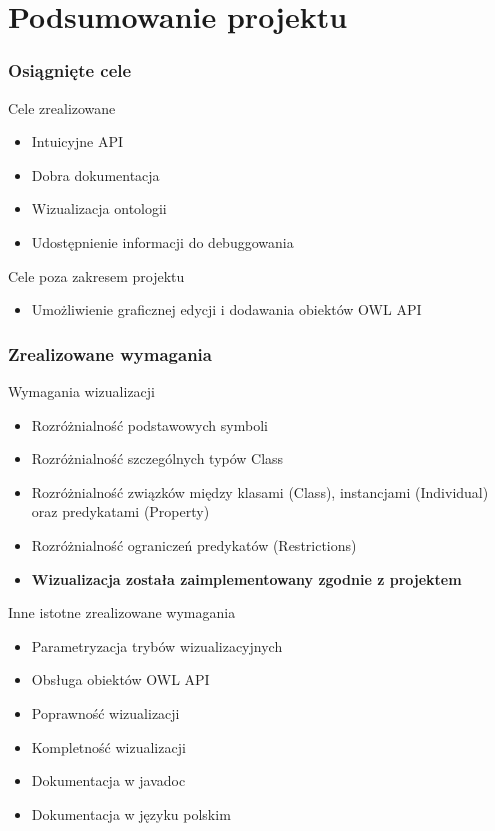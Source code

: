 \documentclass[xcolor=dvipsnames,9pt]{beamer}
\begin{document}
\section{Podsumowanie projektu}

\begin{frame}
	\frametitle{Osiągnięte cele}

\begin{block}{Cele zrealizowane}
		\begin{itemize}
			\item Intuicyjne API
			  \item Dobra dokumentacja
			\item Wizualizacja ontologii 
			\item Udostępnienie informacji do debuggowania 
	\end{itemize}
	\end{block}




	\begin{block}{Cele poza zakresem projektu}
		\begin{itemize}
			\item Umożliwienie graficznej edycji i dodawania obiektów OWL API
	\end{itemize}
	\end{block}


\end{frame}


\begin{frame}
	\frametitle{Zrealizowane wymagania}
	

	\begin{block}{Wymagania wizualizacji}
	\begin{itemize}
			
			\item Rozróżnialność podstawowych symboli
			\item Rozróżnialność szczególnych typów Class
			\item Rozróżnialność związków między klasami (Class), instancjami (Individual) oraz predykatami (Property)
			\item Rozróżnialność ograniczeń predykatów (Restrictions)
			\item \textbf{Wizualizacja została zaimplementowany zgodnie z projektem} 
	\end{itemize}
	\end{block}

	\begin{block}{Inne istotne zrealizowane wymagania}
	\begin{itemize}
			\item Parametryzacja trybów wizualizacyjnych
			\item Obsługa obiektów OWL API
			\item Poprawność wizualizacji
			\item Kompletność wizualizacji
			\item Dokumentacja w javadoc
			\item Dokumentacja w języku polskim
	\end{itemize}
	\end{block}
\end{frame}
\end{document}
